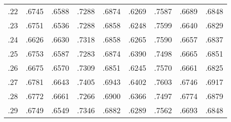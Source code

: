 \documentclass[a4paper,10pt]{article} %
\begin{document}
\begin{tabular} {ccccccccc}
    .22  & .6745 & .6588 & .7288 & .6874 & .6269 & .7587 & .6689 & .6848  \\
    .23  & .6751 & .6536 & .7288 & .6858 & .6248 & .7599 & .6640 & .6829  \\
    .24  & .6626 & .6630 & .7318 & .6858 & .6265 & .7590 & .6657 & .6837  \\
    .25  & .6753 & .6587 & .7283 & .6874 & .6390 & .7498 & .6665 & .6851  \\
    .26  & .6675 & .6570 & .7309 & .6851 & .6245 & .7570 & .6661 & .6825  \\
    .27  & .6781 & .6643 & .7405 & .6943 & .6402 & .7603 & .6746 & .6917  \\
    .28  & .6772 & .6661 & .7266 & .6900 & .6366 & .7497 & .6774 & .6879  \\
    .29  & .6749 & .6549 & .7346 & .6882 & .6289 & .7562 & .6693 & .6848  \\

\end{tabular}
\end{document}
